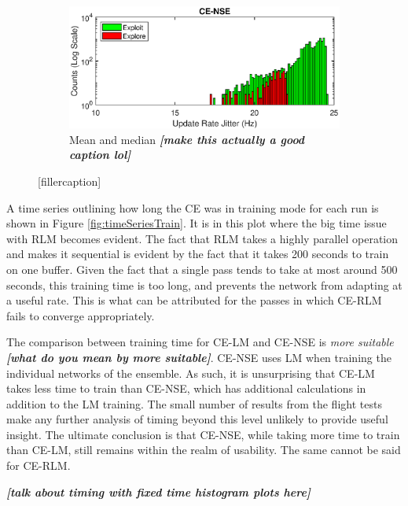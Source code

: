 \begin{figure}[ht]
\begin{subfigure}{\linewidth}
\centering
\includegraphics[scale=0.8]{figures/flight_results/coop_great_nse_updateRateJitter_log.eps}
\caption{Mean and median \textit{\textbf{[make this actually a good caption lol]}}}
\label{fig:flightCoopGoodUnweightSum}
\end{subfigure}

\caption{[fillercaption]}
\label{fig:histExecTimes}
\end{figure}

\clearpage
\par A time series outlining how long the CE was in training mode for each run is shown in Figure \ref{fig:timeSeriesTrain}. It is in this plot where the big time issue with RLM becomes evident. The fact that RLM takes a highly parallel operation and makes it sequential is evident by the fact that it takes 200 seconds to train on one buffer. Given the fact that a single pass tends to take at most around 500 seconds, this training time is too long, and prevents the network from adapting at a useful rate. This is what can be attributed for the passes in which CE-RLM fails to converge appropriately.
\par The comparison between training time for CE-LM and CE-NSE is \textit{more suitable \textbf{[what do you mean by more suitable]}}. CE-NSE uses LM when training the individual networks of the ensemble. As such, it is unsurprising that CE-LM takes less time to train than CE-NSE, which has additional calculations in addition to the LM training. The small number of results from the flight tests make any further analysis of timing beyond this level unlikely to provide useful insight. The ultimate conclusion is that CE-NSE, while taking more time to train than CE-LM, still remains within the realm of usability. The same cannot be said for CE-RLM. 
\par \textit{\textbf{[talk about timing with fixed time histogram plots here]}}


